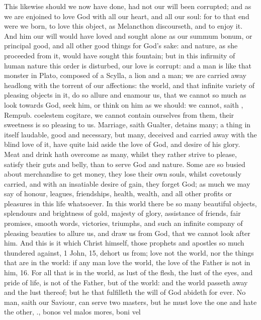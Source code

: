 {This likewise should we now have done, had not our will been corrupted;
and as we are enjoined to love God with all our heart, and all our
soul: for to that end were we born, to love this object, as
Melancthon discourseth, and to enjoy it. And him our will would
have loved and sought alone as our summum bonum, or principal good, and
all other good things for God's sake: and nature, as she proceeded from
it, would have sought this fountain; but in this infirmity of human
nature this order is disturbed, our love is corrupt: and a man is like
that monster in Plato, composed of a Scylla, a lion and a man; we
are carried away headlong with the torrent of our affections: the
world, and that infinite variety of pleasing objects in it, do so
allure and enamour us, that we cannot so much as look towards God, seek
him, or think on him as we should: we cannot, saith \Austin{}, Rempub.
coelestem cogitare, we cannot contain ourselves from them, their
sweetness is so pleasing to us. Marriage, saith  Gualter, detains
many; a thing in itself laudable, good and necessary, but many,
deceived and carried away with the blind love of it, have quite laid
aside the love of God, and desire of his glory. Meat and drink hath
overcome as many, whilst they rather strive to please, satisfy their
guts and belly, than to serve God and nature. Some are so busied about
merchandise to get money, they lose their own souls, whilst covetously
carried, and with an insatiable desire of gain, they forget God; as
much we may say of honour, leagues, friendships, health, wealth, and
all other profits or pleasures in this life whatsoever. In this
world there be so many beautiful objects, splendours and brightness of
gold, majesty of glory, assistance of friends, fair promises, smooth
words, victories, triumphs, and such an infinite company of pleasing
beauties to allure us, and draw us from God, that we cannot look after
him. And this is it which Christ himself, those prophets and apostles
so much thundered against, 1 John,  15, dehort us from; love not
the world, nor the things that are in the world: if any man love the
world, the love of the Father is not in him, 16. For all that is in the
world, as lust of the flesh, the lust of the eyes, and pride of life,
is not of the Father, but of the world: and the world passeth away and
the lust thereof; but he that fulfilleth the will of God abideth for
ever. No man, saith our Saviour, can serve two masters, but he must
love the one and hate the other, \etc{}., bonos vel malos mores, boni vel
}
